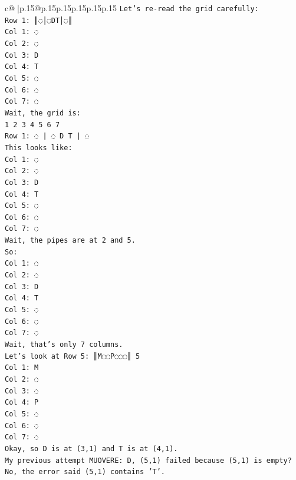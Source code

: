 \documentclass{article}
\begin{document}
{\begin{supertabular}{c@{$\;$}|p{.15\linewidth}@{}p{.15\linewidth}p{.15\linewidth}p{.15\linewidth}p{.15\linewidth}p{.15\linewidth}}
{{{\texttt{Let's re{-}read the grid carefully:} \\
\texttt{Row 1: ║◌│◌DT│◌║} \\
\texttt{Col 1: ◌} \\
\texttt{Col 2: ◌} \\
\texttt{Col 3: D} \\
\texttt{Col 4: T} \\
\texttt{Col 5: ◌} \\
\texttt{Col 6: ◌} \\
\texttt{Col 7: ◌} \\
\texttt{Wait, the grid is:} \\
\texttt{1 2 3 4 5 6 7} \\
\texttt{Row 1: ◌ | ◌ D T | ◌} \\
\texttt{This looks like:} \\
\texttt{Col 1: ◌} \\
\texttt{Col 2: ◌} \\
\texttt{Col 3: D} \\
\texttt{Col 4: T} \\
\texttt{Col 5: ◌} \\
\texttt{Col 6: ◌} \\
\texttt{Col 7: ◌} \\
\texttt{Wait, the pipes are at 2 and 5.} \\
\texttt{So:} \\
\texttt{Col 1: ◌} \\
\texttt{Col 2: ◌} \\
\texttt{Col 3: D} \\
\texttt{Col 4: T} \\
\texttt{Col 5: ◌} \\
\texttt{Col 6: ◌} \\
\texttt{Col 7: ◌} \\
\texttt{Wait, that's only 7 columns.} \\
\texttt{Let's look at Row 5: ║M◌◌P◌◌◌║ 5} \\
\texttt{Col 1: M} \\
\texttt{Col 2: ◌} \\
\texttt{Col 3: ◌} \\
\texttt{Col 4: P} \\
\texttt{Col 5: ◌} \\
\texttt{Col 6: ◌} \\
\texttt{Col 7: ◌} \\
\texttt{Okay, so D is at (3,1) and T is at (4,1).} \\
\texttt{My previous attempt MUOVERE: D, (5,1) failed because (5,1) is empty? No, the error said (5,1) contains 'T'.} \\
}}}
\end{supertabular}}
\end{document}

